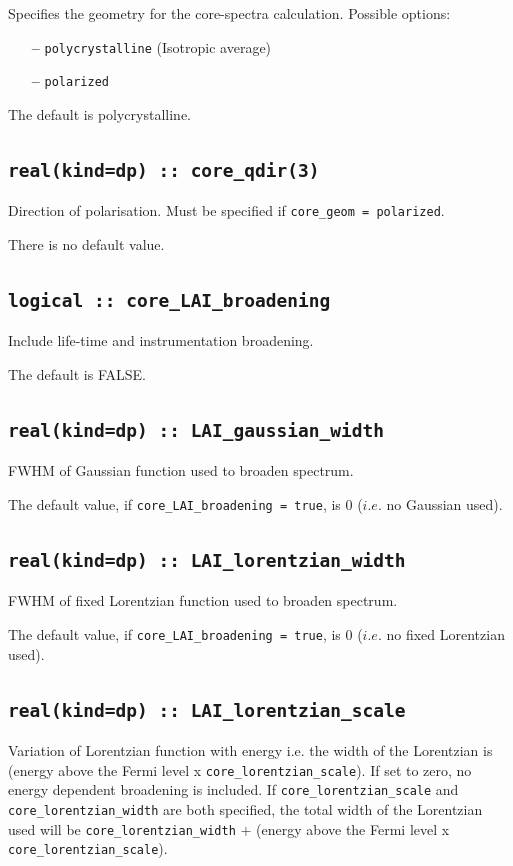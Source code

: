 \documentclass[a4paper,11pt,twoside]{book}
\begin{document}
{Specifies the geometry for the core-spectra calculation.  Possible options: 
\begin{itemize}
\item[{\bf --}]  \verb#polycrystalline# (Isotropic average)
\item[{\bf --}]  \verb#polarized#  
\end{itemize}
The default is polycrystalline.

\subsection[core\_qdir]{\tt real(kind=dp) :: core\_qdir(3)}
Direction of polarisation. Must be specified if \verb#core_geom = polarized#.

There is no default value.

\subsection[core\_LAI\_broadening]{\tt logical :: core\_LAI\_broadening}
Include life-time and instrumentation broadening.  

The default is FALSE.

\subsection[core\_gaussian\_width]{\tt real(kind=dp) :: LAI\_gaussian\_width}
FWHM of Gaussian function used to broaden spectrum.  

The default value, if \verb#core_LAI_broadening = true#, is 0 ($i.e.$ no Gaussian used).

\subsection[core\_lorentzian\_width]{\tt real(kind=dp) :: LAI\_lorentzian\_width}
FWHM of fixed Lorentzian function used to broaden spectrum.  

The default value, if \verb#core_LAI_broadening = true#, is 0 ($i.e.$ no fixed Lorentzian used).

\subsection[core\_lorentzian\_scale]{\tt real(kind=dp) :: LAI\_lorentzian\_scale}
Variation of Lorentzian function with energy i.e. the width of the Lorentzian is (energy above the Fermi level x 
\verb#core_lorentzian_scale#).  If set to zero, no energy dependent broadening is included.  
If \verb#core_lorentzian_scale# and \verb#core_lorentzian_width# are both specified, the 
total width of the Lorentzian used will be \verb#core_lorentzian_width# + (energy above the Fermi level x 
\verb#core_lorentzian_scale#).

}
\end{document}
